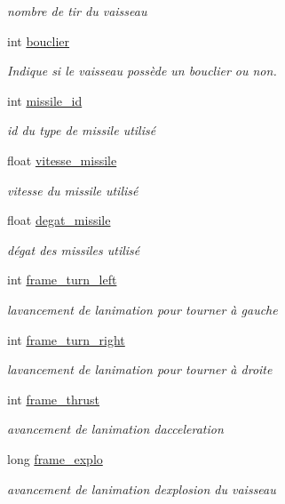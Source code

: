 \begin{DoxyCompactItemize}
\begin{DoxyCompactList}\small\item\em nombre de tir du vaisseau \end{DoxyCompactList}\item 
int \hyperlink{struct_vaiss_abccb7ae50f5a9e2ac6bb3c55d95e89eb}{bouclier}
\begin{DoxyCompactList}\small\item\em Indique si le vaisseau possède un bouclier ou non. \end{DoxyCompactList}\item 
int \hyperlink{struct_vaiss_a2d89e3bc77b94dfa058abe8754f54691}{missile\+\_\+id}
\begin{DoxyCompactList}\small\item\em id du type de missile utilisé \end{DoxyCompactList}\item 
float \hyperlink{struct_vaiss_a505eb5f7ba36b2908a93da45d647413c}{vitesse\+\_\+missile}
\begin{DoxyCompactList}\small\item\em vitesse du missile utilisé \end{DoxyCompactList}\item 
float \hyperlink{struct_vaiss_aac3dfe507a9390c8e409296fc655457e}{degat\+\_\+missile}
\begin{DoxyCompactList}\small\item\em dégat des missiles utilisé \end{DoxyCompactList}\item 
int \hyperlink{struct_vaiss_aba1fc8693cb37743370747ca934d9320}{frame\+\_\+turn\+\_\+left}
\begin{DoxyCompactList}\small\item\em l\textquotesingle{}avancement de l\textquotesingle{}animation pour tourner à gauche \end{DoxyCompactList}\item 
int \hyperlink{struct_vaiss_a6743709307197dee49a3c58bcaae62ff}{frame\+\_\+turn\+\_\+right}
\begin{DoxyCompactList}\small\item\em l\textquotesingle{}avancement de l\textquotesingle{}animation pour tourner à droite \end{DoxyCompactList}\item 
int \hyperlink{struct_vaiss_a8beb984425902e27a90e232417279a4e}{frame\+\_\+thrust}
\begin{DoxyCompactList}\small\item\em avancement de l\textquotesingle{}animation d\textquotesingle{}acceleration \end{DoxyCompactList}\item 
long \hyperlink{struct_vaiss_a06e5d929598d839bd61673f0c56f1684}{frame\+\_\+explo}
\begin{DoxyCompactList}\small\item\em avancement de l\textquotesingle{}animation d\textquotesingle{}explosion du vaisseau \end{DoxyCompactList}\end{DoxyCompactItemize}



